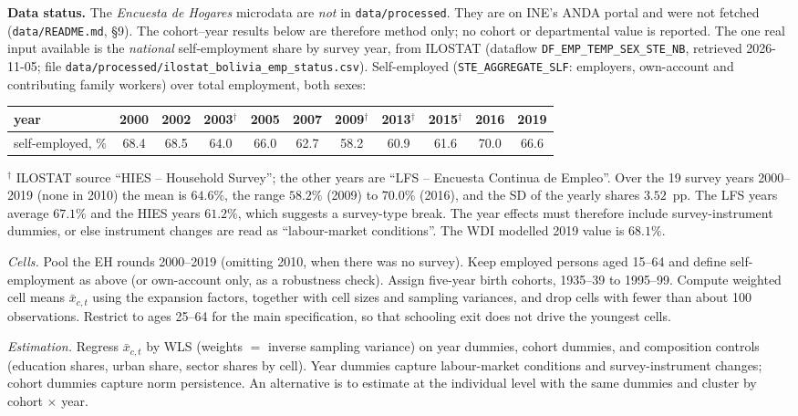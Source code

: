 \documentclass[../solutions_manual.tex]{subfiles}
\begin{document}
\textbf{Data status.} The \textit{Encuesta de Hogares} microdata are \emph{not} in \texttt{data/processed}. They are on INE's ANDA portal and were not fetched (\texttt{data/README.md}, \S9). The cohort--year results below are therefore method only; no cohort or departmental value is reported. The one real input available is the \emph{national} self-employment share by survey year, from ILOSTAT (dataflow \nolinkurl{DF_EMP_TEMP_SEX_STE_NB}, retrieved 2026-11-05; file \nolinkurl{data/processed/ilostat_bolivia_emp_status.csv}). Self-employed (\nolinkurl{STE_AGGREGATE_SLF}: employers, own-account and contributing family workers) over total employment, both sexes:
\begin{center}
\footnotesize\setlength{\tabcolsep}{3.5pt}
\begin{tabular}{lcccccccccc}
\toprule
year & 2000 & 2002 & 2003$^\dagger$ & 2005 & 2007 & 2009$^\dagger$ & 2013$^\dagger$ & 2015$^\dagger$ & 2016 & 2019 \\
\midrule
self-employed, \% & 68.4 & 68.5 & 64.0 & 66.0 & 62.7 & 58.2 & 60.9 & 61.6 & 70.0 & 66.6 \\
\bottomrule
\end{tabular}
\end{center}
$^\dagger$ ILOSTAT source ``HIES -- Household Survey''; the other years are ``LFS -- Encuesta Continua de Empleo''. Over the 19 survey years 2000--2019 (none in 2010) the mean is $64.6\%$, the range $58.2\%$ (2009) to $70.0\%$ (2016), and the SD of the yearly shares $3.52$~pp. The LFS years average $67.1\%$ and the HIES years $61.2\%$, which suggests a survey-type break. The year effects must therefore include survey-instrument dummies, or else instrument changes are read as ``labour-market conditions''. The WDI modelled 2019 value is $68.1\%$.

 \emph{Cells.} Pool the EH rounds 2000--2019 (omitting 2010, when there was no survey). Keep employed persons aged 15--64 and define self-employment as above (or own-account only, as a robustness check). Assign five-year birth cohorts, 1935--39 to 1995--99. Compute weighted cell means $\bar x_{c,t}$ using the expansion factors, together with cell sizes and sampling variances, and drop cells with fewer than about 100 observations. Restrict to ages 25--64 for the main specification, so that schooling exit does not drive the youngest cells.

 \emph{Estimation.} Regress $\bar x_{c,t}$ by WLS (weights $=$ inverse sampling variance) on year dummies, cohort dummies, and composition controls (education shares, urban share, sector shares by cell). Year dummies capture labour-market conditions and survey-instrument changes; cohort dummies capture norm persistence. An alternative is to estimate at the individual level with the same dummies and cluster by cohort $\times$ year.
\end{document}

